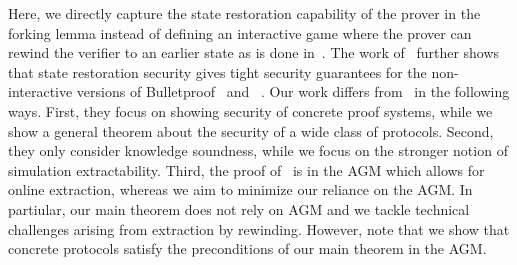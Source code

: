 Here, we directly capture the state restoration capability of the prover in the forking lemma instead of defining an interactive game where the prover can rewind the verifier to an earlier state as is done in~\cite{C:GhoTes21}. 
The work of~\cite{C:GhoTes21} further shows that state restoration security gives tight security guarantees for the
non-interactive versions of Bulletproof~\cite{SP:BBBPWM18} and \sonic~. 
Our work differs from~\cite{C:GhoTes21} in the following ways. First, they
focus on showing security of concrete proof systems, while we show
a general theorem about the security of a wide class of protocols. 
Second, they only consider knowledge soundness, while we focus on the stronger notion of simulation extractability. Third, the proof of~\cite{C:GhoTes21} is in the AGM which allows for online extraction, whereas we aim to minimize our reliance on the AGM. In partiular, our main theorem does not rely on AGM and we tackle technical challenges arising from extraction by rewinding. 
However, note that we show that concrete protocols satisfy the preconditions of our main theorem in the AGM.



